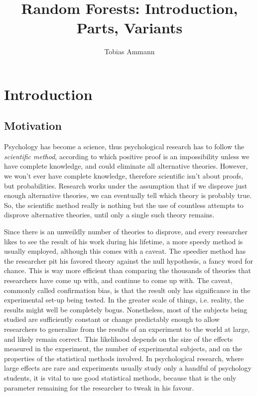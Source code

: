 \documentclass[a4paper,man,12pt,apacite,floatsintext,draftfirst]{apa6} %
\title{Random Forests: Introduction, Parts, Variants}
\author{Tobias Ammann}
\affiliation{Literature Study at the Workgroup for Psychological Methods,\\Evaluation and Statistics, Department of Psychology.\\Supervised by Prof. Dr. Carolin Strobl}
\begin{document}
\maketitle

\tableofcontents

\newpage
\section{Introduction}

\subsection{Motivation}
Psychology has become a science, thus psychological research has to follow
the \emph{scientific method}, according to which positive proof is an
impossibility unless we have complete knowledge, and could eliminate all
alternative theories.
However, we won't ever have complete knowledge, therefore scientific isn't
about proofs, but probabilities.
Research works under the assumption that if we disprove just enough
alternative theories, we can eventually tell which theory is probably
true.
So, the scientific method really is nothing but the use of countless
attempts to disprove alternative theories, until only a single such theory
remains.

Since there is an unweildly number of theories to disprove, and every
researcher likes to see the result of his work during his lifetime, a
more speedy method is usually employed, although this comes with a caveat.
The speedier method has the researcher pit his favored theory against
the null hypothesis, a fancy word for chance.
This is way more efficient than comparing the thousands of
theories that researchers have come up with, and continue to come up with.
The caveat, commonly called confirmation bias, is that the result only
has significance in the experimental set-up being tested.
In the greater scale of things, i.e. reality, the results might well be
completely bogus.
Nonetheless, most of the subjects being studied are sufficiently constant
or change predictably enough to allow researchers to generalize from the
results of an experiment to the world at large, and likely remain correct.
This likelihood depends on the size of the effects measured in the
experiment, the number of experimental subjects, and on the properties of the
statistical methods involved.
In psychological research, where large effects are rare and
experiments usually study only a handful of psychology students, it is
vital to use good statistical methods, because that is the only parameter
remaining for the researcher to tweak in his favour.
\end{document}
